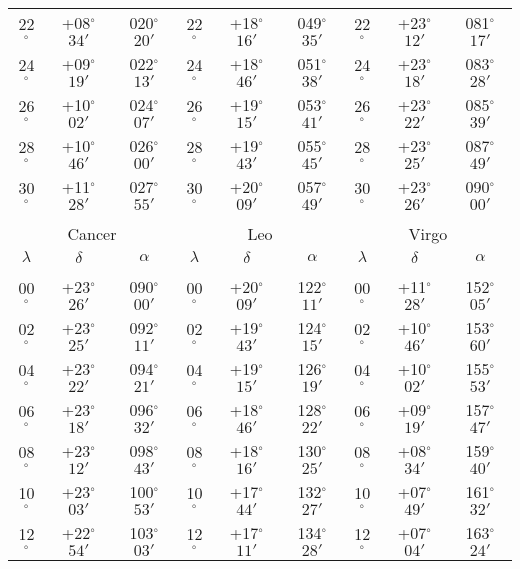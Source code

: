 \begin{table}
\begin{tabular}{ccc|ccc|ccc}
22$^\circ$ & +08$^\circ$$34'$ & 020$^\circ$$20'$ & 22$^\circ$ & +18$^\circ$$16'$ & 049$^\circ$$35'$ & 22$^\circ$ & +23$^\circ$$12'$ & 081$^\circ$$17'$\\
24$^\circ$ & +09$^\circ$$19'$ & 022$^\circ$$13'$ & 24$^\circ$ & +18$^\circ$$46'$ & 051$^\circ$$38'$ & 24$^\circ$ & +23$^\circ$$18'$ & 083$^\circ$$28'$\\
26$^\circ$ & +10$^\circ$$02'$ & 024$^\circ$$07'$ & 26$^\circ$ & +19$^\circ$$15'$ & 053$^\circ$$41'$ & 26$^\circ$ & +23$^\circ$$22'$ & 085$^\circ$$39'$\\
28$^\circ$ & +10$^\circ$$46'$ & 026$^\circ$$00'$ & 28$^\circ$ & +19$^\circ$$43'$ & 055$^\circ$$45'$ & 28$^\circ$ & +23$^\circ$$25'$ & 087$^\circ$$49'$\\
30$^\circ$ & +11$^\circ$$28'$ & 027$^\circ$$55'$ & 30$^\circ$ & +20$^\circ$$09'$ & 057$^\circ$$49'$ & 30$^\circ$ & +23$^\circ$$26'$ & 090$^\circ$$00'$\\
\multicolumn{9}{c}{}\\
\multicolumn{3}{c}{Cancer}\vline & \multicolumn{3}{c}{Leo} \vline& \multicolumn{3}{c}{Virgo}\\\hline
$\lambda$& $\delta$& $\alpha$& $\lambda$& $\delta$& $\alpha$& $\lambda$& $\delta$& $\alpha$\\\hline
&&&&&&&&\\[-2ex]
00$^\circ$ & +23$^\circ$$26'$ & 090$^\circ$$00'$ & 00$^\circ$ & +20$^\circ$$09'$ & 122$^\circ$$11'$ & 00$^\circ$ & +11$^\circ$$28'$ & 152$^\circ$$05'$\\
02$^\circ$ & +23$^\circ$$25'$ & 092$^\circ$$11'$ & 02$^\circ$ & +19$^\circ$$43'$ & 124$^\circ$$15'$ & 02$^\circ$ & +10$^\circ$$46'$ & 153$^\circ$$60'$\\
04$^\circ$ & +23$^\circ$$22'$ & 094$^\circ$$21'$ & 04$^\circ$ & +19$^\circ$$15'$ & 126$^\circ$$19'$ & 04$^\circ$ & +10$^\circ$$02'$ & 155$^\circ$$53'$\\
06$^\circ$ & +23$^\circ$$18'$ & 096$^\circ$$32'$ & 06$^\circ$ & +18$^\circ$$46'$ & 128$^\circ$$22'$ & 06$^\circ$ & +09$^\circ$$19'$ & 157$^\circ$$47'$\\
08$^\circ$ & +23$^\circ$$12'$ & 098$^\circ$$43'$ & 08$^\circ$ & +18$^\circ$$16'$ & 130$^\circ$$25'$ & 08$^\circ$ & +08$^\circ$$34'$ & 159$^\circ$$40'$\\
10$^\circ$ & +23$^\circ$$03'$ & 100$^\circ$$53'$ & 10$^\circ$ & +17$^\circ$$44'$ & 132$^\circ$$27'$ & 10$^\circ$ & +07$^\circ$$49'$ & 161$^\circ$$32'$\\
12$^\circ$ & +22$^\circ$$54'$ & 103$^\circ$$03'$ & 12$^\circ$ & +17$^\circ$$11'$ & 134$^\circ$$28'$ & 12$^\circ$ & +07$^\circ$$04'$ & 163$^\circ$$24'$\\

\end{tabular}
\end{table}
